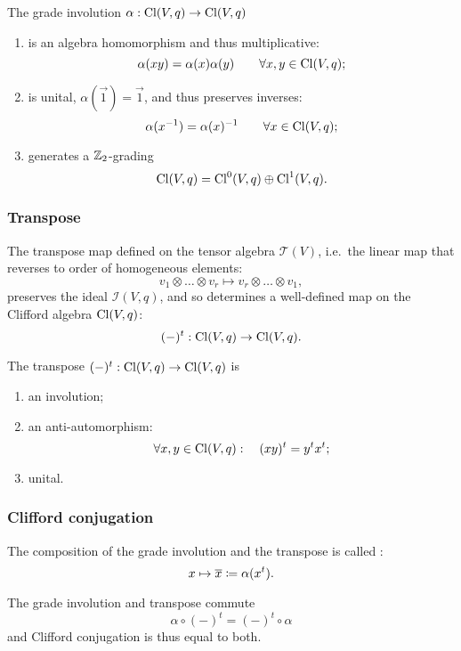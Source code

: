 \begin{lemma}
The grade involution $\alpha: \operatorname{Cl}(V,q) \to \operatorname{Cl}(V,q)$
\begin{enumerate}
\item is an algebra homomorphism and thus multiplicative:
\[ \alpha(xy) = \alpha(x)\alpha(y) \qquad\forall x,y\in \operatorname{Cl}(V,q); \]
\item is unital, $\alpha(\vec{1}) = \vec{1}$, and thus preserves inverses:
\[ \alpha(x^{-1}) = \alpha(x)^{-1} \qquad\forall x\in \operatorname{Cl}(V,q); \]
\item generates a $\mathbb{Z}_2$-grading 
\[ \operatorname{Cl}(V,q) = \operatorname{Cl}^0(V,q)\oplus \operatorname{Cl}^1(V,q). \]
\end{enumerate}
\end{lemma}

\subsubsection{Transpose}
The transpose map defined on the tensor algebra $\mathcal{T}(V)$, i.e.\ the linear map that reverses to order of homogeneous elements:
\[ v_1\otimes \ldots \otimes v_r \mapsto v_r \otimes \ldots \otimes v_1, \]
preserves the ideal $\mathcal{I}(V,q)$, and so determines a well-defined map on the Clifford algebra $\operatorname{Cl}(V,q)$:
\[ (-)^t: \operatorname{Cl}(V,q)\to \operatorname{Cl}(V,q). \]
\begin{lemma}
The transpose $(-)^t: \operatorname{Cl}(V,q)\to \operatorname{Cl}(V,q)$ is
\begin{enumerate}
\item an involution;
\item an anti-automorphism:
\[ \forall x,y\in \operatorname{Cl}(V,q): \quad (xy)^t = y^tx^t; \]
\item unital.
\end{enumerate}
\end{lemma}

\subsubsection{Clifford conjugation}
\begin{definition}
The composition of the grade involution and the transpose is called :
\[ x\mapsto \overline{x} \coloneqq \alpha(x^t). \]
\end{definition}
\begin{lemma}
The grade involution and transpose commute
\[ \alpha \circ(-)^t = (-)^t\circ \alpha \]
and Clifford conjugation is thus equal to both.
\end{lemma}

